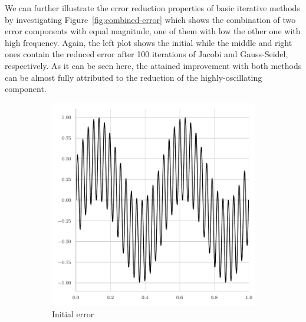 We can further illustrate the error reduction properties of basic iterative methods by investigating Figure~\ref{fig:combined-error} which shows the combination of two error components with equal magnitude, one of them with low the other one with high frequency.
Again, the left plot shows the initial while the middle and right ones contain the reduced error after 100 iterations of Jacobi and Gauss-Seidel, respectively.
As it can be seen here, the attained improvement with both methods can be almost fully attributed to the reduction of the highly-oscillating component.
\begin{figure}
	\begin{subfigure}[b]{0.32\textwidth}
	\centering
		\includegraphics[width=\textwidth]{figures/initial_error_jacobi_combined.pdf}
		\caption{Initial error}
\end{subfigure}
\hfill
\begin{subfigure}[b]{0.32\textwidth}
	\centering

\end{subfigure}
\end{figure}
